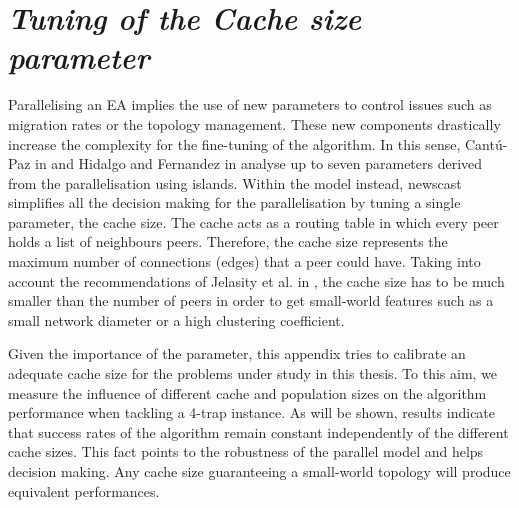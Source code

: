 
\appendix
{}
\chapter{\textit{Tuning of the Cache size parameter}}
\label{cap:appendixA}



Parallelising an EA implies the use of new parameters to control issues such as migration rates or the topology management. These new components drastically increase the complexity for the fine-tuning of the algorithm. In this sense, Cant\'u-Paz in \cite{cantu99:topologies} and Hidalgo and Fernandez in \cite{Fernandez:balancing} analyse up to seven  parameters derived from the parallelisation using islands. Within the \evag model instead, newscast simplifies all the decision making for the parallelisation by tuning  a single parameter, the cache size. The cache acts as a routing table  in which every peer holds a list of neighbours peers. Therefore, the cache size represents the maximum number of connections (edges) that a peer could have. Taking into account the recommendations of Jelasity et al. in \cite{jelasity:gossip}, the cache size has to be much smaller than the number of peers in order to get small-world features such as a small network diameter or a high clustering coefficient. 

Given the importance of the parameter, this appendix tries to calibrate an adequate cache size for the problems under study in this thesis. To this aim, we  measure the influence of different cache and population sizes on the algorithm performance when tackling a 4-trap instance. As will be shown, results indicate that success rates of the algorithm remain constant independently of the different cache sizes. This fact points to the robustness of the parallel model and helps decision making. Any cache size guaranteeing a small-world topology will produce equivalent performances.

